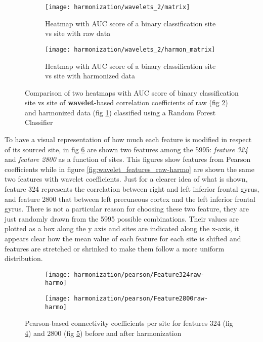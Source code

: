 \documentclass[11pt]{report}
\begin{document}
\begin{figure}
\centering
\begin{subfigure}[b]{0.70\textwidth}
   \texttt{[image: harmonization/wavelets\_2/matrix]}
   \caption{Heatmap with AUC score of a binary classification site vs site with raw data}
   \label{fig:heatmap_harmonization_noharmon_w}
\end{subfigure}

\begin{subfigure}[b]{0.70\textwidth}
   \texttt{[image: harmonization/wavelets\_2/harmon\_matrix]}
   \caption{Heatmap with AUC score of a binary classification site vs site with harmonized data}
   \label{fig:heatmap_harmonization_harmon_w}
\end{subfigure}

\caption{Comparison of two heatmaps with AUC score of binary classification site vs site of \textbf{wavelet}-based correlation coefficients of raw (fig \ref{fig:heatmap_harmonization_harmon_w}) and harmonized data (fig \ref{fig:heatmap_harmonization_noharmon_w}) classified using a Random Forest Classifier
}
\label{fig:heatmap_harmonization_w}
\end{figure}





To have a visual representation of how much each feature is modified in respect of its sourced site, in fig \ref{fig:features_raw-harmo} are shown two features among the 5995: \emph{feature 324} and \emph{feature 2800} as a function of sites. This figures show features from Pearson coefficients while in figure \ref{fig:wavelet_features_raw-harmo} are shown the same two features with wavelet coefficients.
Just for a clearer idea of what is shown, feature 324 represents the correlation between right and left inferior frontal gyrus, and feature 2800 that between left precuneous cortex and the left inferior frontal gyrus. There is not a particular reason for choosing these two feature, they are just randomly drawn from the 5995 possible combinations.
Their values are plotted as a box along the y axis and sites are indicated along the x-axis, it appears clear how the mean value of each feature for each site is shifted and features are stretched or shrinked to make them follow a more uniform distribution.

\begin{figure}
\centering
\begin{subfigure}[b]{1.\textwidth}
   \texttt{[image: harmonization/pearson/Feature324raw-harmo]}
   \caption{}
   \label{fig:feature324}
\end{subfigure}
\begin{subfigure}[b]{1.\textwidth}
   \texttt{[image: harmonization/pearson/Feature2800raw-harmo]}
   \caption{}
   \label{fig:feature2800}
\end{subfigure}
\caption{Pearson-based connectivity coefficients per site for features 324 (fig \ref{fig:feature324}) and 2800 (fig \ref{fig:feature2800}) before and after harmonization}
\label{fig:features_raw-harmo}
\end{figure}
\end{document}
